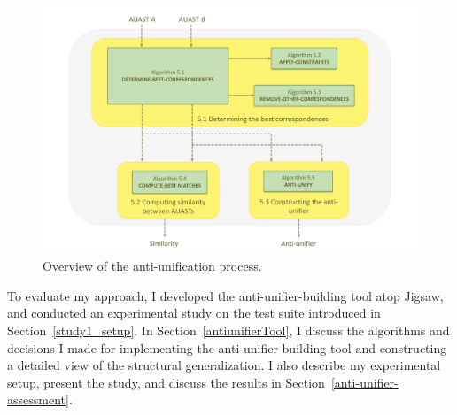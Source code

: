 


\begin{figure}[t]
  \centering\includegraphics [width = \textwidth]{Drawing4/auOverview.pdf}
  \caption{Overview of the anti-unification process.}
  \label{fig:meth_overview}
\end{figure}


To evaluate my approach, I developed the anti-unifier-building tool atop Jigsaw, and conducted an experimental study on the test suite introduced in Section~\ref{study1_setup}. In Section~\ref{antiunifierTool}, I discuss the algorithms and decisions I made for implementing the anti-unifier-building tool and constructing a detailed view of the structural generalization. I also describe my experimental setup, present the study, and discuss the results in Section~\ref{anti-unifier-assessment}.





